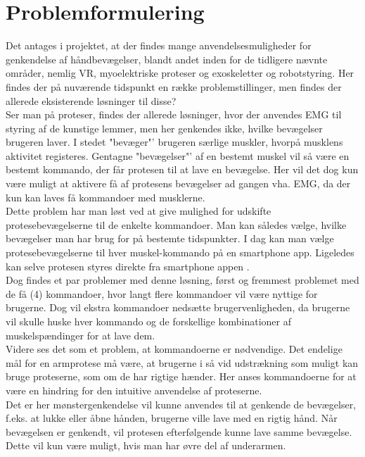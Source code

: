 \thispagestyle{fancy}
\chapter{Problemformulering}
\label{chp:problemformulering}

Det antages i projektet, at der findes mange anvendelsesmuligheder for genkendelse af håndbevægelser, blandt andet inden for de tidligere nævnte områder, nemlig VR, myoelektriske proteser og exoskeletter og robotstyring. Her findes der på nuværende tidspunkt en række problemstillinger, men findes der allerede eksisterende løsninger til disse?\\

Ser man på proteser, findes der allerede løsninger, hvor der anvendes EMG til styring af de kunstige lemmer, men her genkendes ikke, hvilke bevægelser brugeren laver. I stedet "bevæger"' brugeren særlige muskler, hvorpå musklens aktivitet registeres. Gentagne "bevægelser"' af en bestemt muskel vil så være en bestemt kommando, der får protesen til at lave en bevægelse. Her vil det dog kun være muligt at aktivere få af protesens bevægelser ad gangen vha. EMG, da der kun kan laves få kommandoer med musklerne. \\

Dette problem har man løst ved at give mulighed for udskifte protesebevægelserne til de enkelte kommandoer. Man kan således vælge, hvilke bevægelser man har brug for på bestemte tidspunkter. I dag kan man vælge protesebevægelserne til hver muskel-kommando på en smartphone app. Ligeledes kan selve protesen styres direkte fra smartphone appen \citep{RefWorks:12}.\\
Dog findes et par problemer med denne løsning, først og fremmest problemet med de få (4) kommandoer, hvor langt flere kommandoer vil være nyttige for brugerne. Dog vil ekstra kommandoer nedsætte brugervenligheden, da brugerne vil skulle huske hver kommando og de forskellige kombinationer af muskelspændinger for at lave dem.\\

Videre ses det som et problem, at kommandoerne er nødvendige. Det endelige mål for en armprotese må være, at brugerne i så vid udstrækning som muligt kan bruge proteserne, som om de har rigtige hænder. Her anses kommandoerne for at være en hindring for den intuitive anvendelse af proteserne.\\

Det er her mønstergenkendelse vil kunne anvendes til at genkende de bevægelser, f.eks. at lukke eller åbne hånden, brugerne ville lave med en rigtig hånd. Når bevægelsen er genkendt, vil protesen efterfølgende kunne lave samme bevægelse. Dette vil kun være muligt, hvis man har øvre del af underarmen. \\


